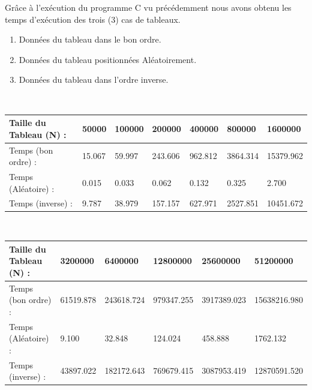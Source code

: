 \documentclass[12pt]{article}
\begin{document}
Grâce à l'exécution du programme C vu précédemment nous avons obtenu les temps d'exécution des trois (3) cas de tableaux.
\begin{enumerate}
	\item Données du tableau dans le bon ordre.
	\item Données du tableau positionnées Aléatoirement.
	\item Données du tableau dans l'ordre inverse.
\end{enumerate}
\color{blue}
\textrm{  }
\\
\begin{tabular}{|p{4cm}||p{1.8cm}|p{1.8cm}|p{1.8cm}|p{1.8cm}|p{1.8cm}|p{1.8cm}|}
\hline
Taille du Tableau (N) : & 50000 & 100000 & 200000 & 400000 & 800000  & 1600000\\
\hline
Temps (bon ordre) : & 15.067 & 59.997 & 243.606 & 962.812 & 3864.314 & 15379.962 \\
\hline

Temps (Aléatoire) : & 0.015 & 0.033 & 0.062 & 0.132 & 0.325 & 2.700 \\
\hline

Temps (inverse) :  & 9.787 & 38.979 & 157.157 & 627.971 & 2527.851 & 10451.672  \\
\hline

\end{tabular}
\\
\begin{tabular}{|p{4cm}||p{2.25cm}|p{2.25cm}|p{2.25cm}|p{2.25cm}|p{2.25cm}|}
\hline
Taille du Tableau (N) : & 3200000 & 6400000 & 12800000 & 25600000 &  51200000  \\
\hline

Temps (bon ordre) : &  61519.878 & 243618.724 & 979347.255 & 3917389.023 & 15638216.980   \\
\hline

Temps (Aléatoire) : & 9.100 & 32.848 & 124.024 & 458.888 & 1762.132  \\
\hline

Temps (inverse) : & 43897.022 & 182172.643 & 769679.415 & 3087953.419 & 12870591.520  \\
\hline

\end{tabular}
\color{black}
\end{document}
